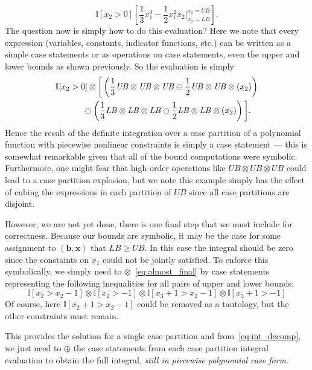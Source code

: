 \documentclass[letterpaper]{article}
\newcommand{\LB}{\mathit{LB}}
\newcommand{\UB}{\mathit{UB}}
\newcommand{\I}{\mathbb{I}}
\renewcommand{\vec}[1]{\mathbf{#1}}
\begin{document}
{{\footnotesize
\begin{equation}
\I[x_2 > 0] \left[ \frac{1}{3}x_1^3 - \frac{1}{2}x_1^2 x_2 \bigg|_{x_1=\LB}^{x_1=\UB} \right] .
\end{equation} }
The question now is simply how to do this evaluation?  Here we note
that every expression (variables, constants, indicator functions, etc.) 
can be written as a 
simple case statements or as operations on case statements, even the upper
and lower bounds as shown previously.  So the evaluation is simply 
\vspace{-1mm}
{\footnotesize
\begin{align}
\I[x_2 > 0] \otimes \bigg[ & \left( \frac{1}{3} \UB \otimes \UB \otimes \UB \ominus \frac{1}{2} \UB \otimes \UB \otimes (x_2) \right) \nonumber \\
& \hspace{-8mm} \ominus \left( \frac{1}{3} \LB \otimes \LB \otimes \LB \ominus \frac{1}{2} \LB \otimes \LB \otimes (x_2) \right) \bigg] \label{eq:almost_final}.
\end{align}
}
Hence the result of the definite integration over a case
partition of a polynomial function with piecewise nonlinear constraints
is simply a case statement --- this is somewhat remarkable given that
all of the bound computations were symbolic.  Furthermore, one might
fear that high-order operations like $\UB \otimes \UB \otimes \UB$
could lead to a case partition explosion, but we note this example simply
has the effect of cubing the expressions in each partition of $\UB$ since
all case partitions are disjoint.

However, we are not yet done, there is one final step that we must
include for correctness.  Because our bounds are symbolic, it may be
the case for some assignment to $(\vec{b},\vec{x})$ that $\LB \geq
\UB$.  In this case the integral should be zero since the constaints
on $x_1$ could not be jointly satisfied.  To enforce this
symbolically, we simply need to $\otimes$~\eqref{eq:almost_final} by
case statements representing the following inequalities for all pairs
of upper and lower bounds:
{\footnotesize
\begin{equation}
\I[x_2 > x_2 - 1] \otimes \I[x_2 > -1] \otimes \I[x_3 + 1 > x_2 - 1] \otimes \I[x_3 + 1 > -1]
\end{equation}}
Of course, here $\I[x_2 + 1 > x_2 - 1]$ could be removed as a tautology,
but the other constraints must remain.

This provides the solution for a single case partition and 
from~\eqref{eq:int_decomp}, we just need to $\oplus$ the case
statements from each case partition integral evaluation to obtain
the full integral, \emph{still in piecewise polynomial case form}.

}
\end{document}
